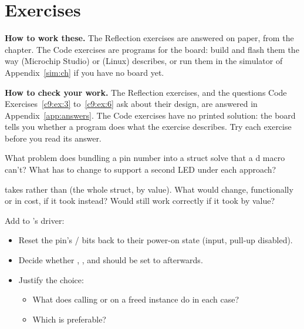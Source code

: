 
\section{Exercises}
\label{c9:sec:exercises}\label{c9:app:b}

\begin{aside}
\textbf{How to work these.} The Reflection exercises are answered on paper, from the chapter. The
Code exercises are programs for the board: build and flash them the way 
(Microchip Studio) or  (Linux) describes, or run them in the simulator of
Appendix~\ref{sim:ch} if you have no board yet.

\textbf{How to check your work.} The Reflection exercises, and the questions Code
Exercises~\ref{c9:ex:3} to~\ref{c9:ex:6} ask about their design, are answered in
Appendix~\ref{app:answers}. The Code exercises have no printed solution: the board tells you
whether a program does what the exercise describes. Try each exercise before you read its answer.
\end{aside}

\label{c9:set:1}

\label{c9:ex:1}
What problem does bundling a pin number into a  struct solve that a
d  macro can't? What has to change to support a second LED under each
approach?

\label{c9:ex:2}
 takes  rather than  (the whole
struct, by value). What would change, functionally or in cost, if it took 
instead? Would  still work correctly if it took  by value?

\label{c9:set:2}

\label{c9:ex:3}
Add  to 's driver:
\begin{itemize}
  \item Reset the pin's / bits back to their power-on state (input,
    pull-up disabled).
  \item Decide whether , , and  should be set
    to  afterwards.
  \item Justify the choice:
  \begin{itemize}
    \item What does calling  or  on a freed instance do in
      each case?
    \item Which is preferable?
  \end{itemize}
\end{itemize}

